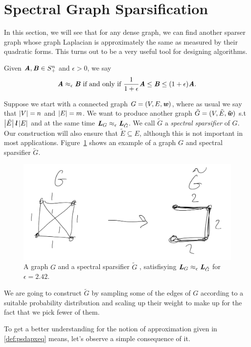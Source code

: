 \section{Spectral Graph Sparsification}

\newcommand\Gtil{\tilde{G}}
\newcommand\Etil{\tilde{E}}

In this section, we will see that for any dense graph, we can find
another sparser graph whose graph Laplacian is approximately the same
as measured by their quadratic forms.
This turns out to be a very useful tool for designing algorithms.

\begin{definition}
  \label{def:psdapxeq}
  Given  $\boldsymbol{\mathit{A}},\boldsymbol{\mathit{B}} \in S_+^n$ and $\epsilon > 0$, we say
  \[
    \boldsymbol{\mathit{A}} \approx_{\epsilon} \boldsymbol{\mathit{B}} \text{ if and only if }
    \frac{1}{1+\epsilon} \boldsymbol{\mathit{A}} \leq \boldsymbol{\mathit{B}} \leq (1+\epsilon) \boldsymbol{\mathit{A}}
    .
    \]
\end{definition}

Suppose we start with a connected graph $G = (V,E,\boldsymbol{\mathit{w}})$, where as usual we say that $\left|V \right|
= n$ and $\left|E \right| = m$.
We want to produce another graph $\Gtil = (V,\Etil,\wwtil)$ s.t
$\abs{\Etil} \muchl \abs{E}$ and at the same time $\LL_{G}
\approx_{\epsilon} \LL_{\Gtil}$.
We call $\Gtil$ a \emph{spectral sparsifier} of $G$.
Our construction will also ensure that $\Etil \subseteq E$, although
this is not important in most applications.
Figure~\ref{fig:gvsgtil} shows an example of a graph $G$ and
spectral sparsifier $\Gtil$.

\begin{figure}[h]
  \centering
  \includegraphics[width=0.6
  \textwidth]{fig/lecture8_gtil}
\caption{A graph $G$ and a spectral sparsifier $\Gtil$
,
  satisfisying
 $\LL_{G} \approx_{\epsilon} \LL_{\Gtil}$ for $\epsilon = 2.42$.
}
\label{fig:gvsgtil}
\end{figure}

We are going to construct $\Gtil$ by sampling some of the edges of $G$
according to a suitable probability distribution and scaling up their weight
to make up for the fact that we pick fewer of them.

To get a better understanding for the notion of approximation given in
\ref{def:psdapxeq} means, let's observe a simple consequence of it.

